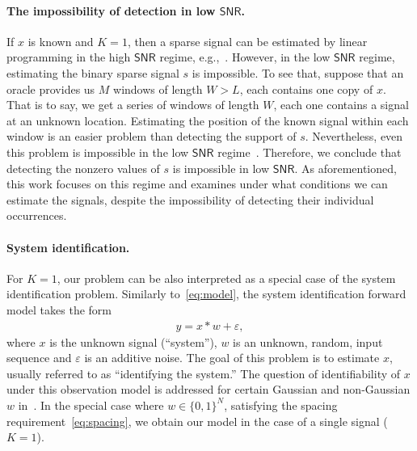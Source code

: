 \documentclass[english,11pt]{article}
\numberwithin{equation}{section}
\theoremstyle{plain}
\theoremstyle{definition}
\theoremstyle{remark}
\theoremstyle{plain}
\theoremstyle{remark}
\theoremstyle{plain}
\theoremstyle{plain}
\newcommand{\SNR}{{\textsf{SNR}}}
\begin{document}
\paragraph{The impossibility of detection in low $\SNR$.}
If $x$ is known and $K=1$, then a sparse signal can be estimated by linear programming  in the high $\SNR$ regime, e.g.,~\cite{azais2015spike,denoyelle2017support,bendory2016robust,bendory2017robust,bernstein2017deconvolution}. However, in the low $\SNR$ regime, estimating the binary sparse signal $s$ is impossible. To see that, suppose that an oracle provides us $M$ windows of length $W>L$, each contains one copy of $x$. That is to say, we get a series of windows of length $W$, each one contains a signal at an unknown location. 
Estimating the position of the known signal within each  window is an easier problem than detecting the support of $s$. 
Nevertheless, even this problem is impossible in the low $\SNR$ regime~\cite{aguerrebere2016fundamental}. Therefore, we conclude that detecting the nonzero values of $s$ is impossible in low $\SNR$. As aforementioned, this work focuses on this regime and examines under what conditions we can estimate the signals, despite the impossibility of detecting their individual occurrences.

\paragraph{System identification.}
For $K=1$, our problem can be also interpreted as a special case of the system identification problem. Similarly to~\eqref{eq:model}, the system identification forward model takes the form
\begin{eqnarray}
y = x\ast w + \varepsilon,  
\end{eqnarray} 
where $x$ is the unknown signal (``system''), $w$ is an unknown, random, input sequence and $\varepsilon$ is an additive noise.   
The goal of this problem is to estimate $x$, usually referred to as ``identifying the system.'' The question of identifiability of $x$ under
this observation model is addressed for certain Gaussian and non-Gaussian $w$ in~\cite{benveniste1980robust,kormylo1983identifiability}.
In the special case where $w\in\{0,1\}^N$, satisfying the spacing requirement~\eqref{eq:spacing}, we obtain our
model in the  case of a single signal ($K = 1$).
\end{document}
